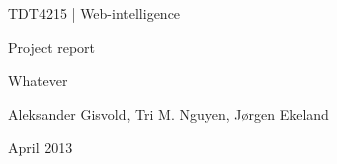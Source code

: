 \begin{titlepage}
\begin{center}
\vspace*{1in}
{\LARGE TDT4215 | Web-intelligence}
\par
\vspace{1in}
{\LARGE Project report}
\par
\vspace{1in}
{\LARGE Whatever}
\par
\vfill
\par
\vspace{0.5in}
Aleksander Gisvold, Tri M. Nguyen, Jørgen Ekeland
\par
April 2013
\end{center}
\end{titlepage}
